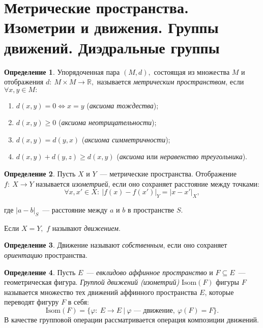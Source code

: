 \documentclass[a4paper, 14pt]{extarticle}
\newcommand{\n}{\par}
\newcommand{\real}{\mathbb{R}}
\newcommand{\Isom}{\mathrm{Isom}}
\renewcommand{\phi}{\varphi}
\theoremstyle{definition}
\newtheorem{definition}{Определение}
\theoremstyle{plain}
\numberwithin{theorem}{section}
\numberwithin{definition}{section}
\numberwithin{statement}{section}
\numberwithin{lemma}{section}
\numberwithin{consequence}{section}
\begin{document}
	\section{Метрические пространства. Изометрии и движения. Группы движений. Диэдральные группы}
	\setcounter{definition}{0}
	\begin{definition}
		Упорядоченная пара ${(M, d),}$ состоящая из множества $M$ и отображения ${d{:} \ M \times M \rightarrow \real,}$  называется \textit{метрическим пространством}, если ${\forall x, y \in M{:}}$
		\begin{enumerate}
			\setlength\itemsep{0.1em}
			\item ${d(x, y) = 0 \Leftrightarrow x = y}$ (\textit{аксиома тождества});
			\item ${d(x, y) \geqslant 0}$ (\textit{аксиома неотрицательности});
			\item ${d(x, y) = d(y, x)}$ (\textit{аксиома симметричности});
			\item ${d(x, y) + d(y, z) \geqslant d(x, y)}$ (\textit{аксиома} или \textit{неравенство треугольника}).
		\end{enumerate}
	\end{definition}
	\begin{definition}
		Пусть $X$ и $Y$~--- метрические пространства. Отображение ${f{:} \ X \rightarrow Y}$ называется \textit{изометрией}, если оно сохраняет расстояние между точками:
		\begin{equation*}
			\forall x, x' \in X{:} \ |f(x) - f(x')|_Y = |x - x'|_X,
		\end{equation*} \n
		где ${|a - b|_S}$~--- расстояние между $a$ и $b$ в пространстве $S$.\n
		Если ${X = Y,}$ $f$ называют \textit{движением}.
	\end{definition}
	\begin{definition}
		Движение называют \textit{собственным}, если оно сохраняет \textit{ориентацию} пространства.
	\end{definition}
	\begin{definition}
		Пусть $E$~--- \textit{евклидово аффинное пространство} и ${F \subseteq E}$~--- геометрическая фигура. \textit{Группой движений (изометрий)} ${\Isom(F)}$ фигуры $F$ называется множество тех движений аффинного пространства $E$, которые  переводят фигуру $F$ в себя:
		\begin{equation*}
			\Isom(F) = \{\phi{:} \ E \rightarrow E \ | \ \phi\textrm{~--- движение}, \ \phi(F) = F\}.
		\end{equation*} 
		В качестве групповой операции рассматривается операция композиции движений.
	\end{definition}
\end{document}
